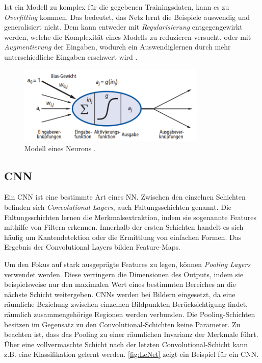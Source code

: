 Ist ein Modell zu komplex für die gegebenen Trainingsdaten, kann es zu \textit{Overfitting} kommen. Das bedeutet, 
das Netz lernt die Beispiele auswendig und generalisiert nicht. 
Dem kann entweder mit \textit{Regularisierung} entgegengewirkt werden, welche die Komplexität eines Modells zu reduzieren versucht,
oder mit \textit{Augmentierung} der Eingaben, wodurch ein Auswendiglernen durch mehr unterschiedliche Eingaben erschwert wird  
\cites{Goodfellow.2016, Russell.2012}.

\begin{figure}
	\centering
	\includegraphics[width=0.8\textwidth]{Bilder/Modell eines Neurons.png} 
	\caption{Modell eines Neurons \cite{Russell.2012}.}
	\label{fig:neuron}
\end{figure} 

\subsection{\acf{CNN}}

Ein \ac{CNN} ist eine bestimmte Art eines \ac{NN}.
Zwischen den einzelnen Schichten befinden sich \textit{Convolutional Layers}, auch Faltungsschichten genannt.
Die Faltungsschichten lernen die Merkmalsextraktion, indem sie sogenannte Features mithilfe von Filtern erkennen.
Innerhalb der ersten Schichten handelt es sich häufig um Kantendetektion oder die Ermittlung von einfachen Formen.
Das Ergebnis der Convolutional Layers bilden Feature-Maps.

Um den Fokus auf stark ausgeprägte Features zu legen, können \textit{Pooling Layers} verwendet werden.
Diese verringern die Dimensionen des Outputs, indem sie beispielsweise nur den maximalen Wert eines bestimmten Bereiches an die nächste Schicht weitergeben.
\ac{CNN}s werden bei Bildern eingesetzt, da eine räumliche Beziehung zwischen einzelnen Bildpunkten Berücksichtigung findet, räumlich zusammengehörige Regionen werden verbunden.
Die Pooling-Schichten besitzen im Gegensatz zu den Convolutional-Schichten keine Parameter.
Zu beachten ist, dass das Pooling zu einer räumlichen Invarianz der Merkmale führt.
Über eine vollvermaschte Schicht nach der letzten Convolutional-Schicht kann z.B. eine Klassifikation gelernt werden.
\autoref{fig:LeNet} zeigt ein Beispiel für ein \ac{CNN}.

